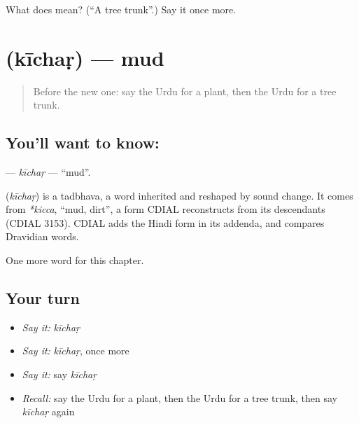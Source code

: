 \begin{tcolorbox}[breakable,colback=teal!4,colframe=teal!35!black,title={Before you move on}]
What does  mean? (\textquotedblleft{}A tree trunk\textquotedblright{}.) Say it once more.
\end{tcolorbox}
\section[\texorpdfstring{\ur{کیچڑ} (kīchaṛ)}{کیچڑ (kīchaṛ)}]{ (kīchaṛ) — mud}

\label{lesson:UR-C173-kichar}



\begin{quote}
Before the new one: say the Urdu for a plant, then the Urdu for a tree trunk.
\end{quote}

\subsection*{You'll want to know: }
\textbf{} — \emph{kīchaṛ} — \textquotedblleft{}mud\textquotedblright{}.

\begin{cousinweb}
\textbf{} (\emph{kīchaṛ}) is a tadbhava, a word inherited and reshaped by sound change. It comes from \emph{*kicca}, \textquotedblleft{}mud, dirt\textquotedblright{}, a form CDIAL reconstructs from its descendants (CDIAL 3153). CDIAL adds the Hindi form in its addenda, and compares Dravidian words.
\end{cousinweb}

\begin{grammarlens}[title={What you've built}]
One more word for this chapter.
\end{grammarlens}

\subsection*{Your turn}
\begin{itemize}
\raggedright
  \item \emph{Say it:} \emph{kīchaṛ}
  \item \emph{Say it:} \emph{kīchaṛ}, once more
  \item \emph{Say it:} say \emph{kīchaṛ}
  \item \emph{Recall:} say the Urdu for a plant, then the Urdu for a tree trunk, then say \emph{kīchaṛ} again
\end{itemize}

